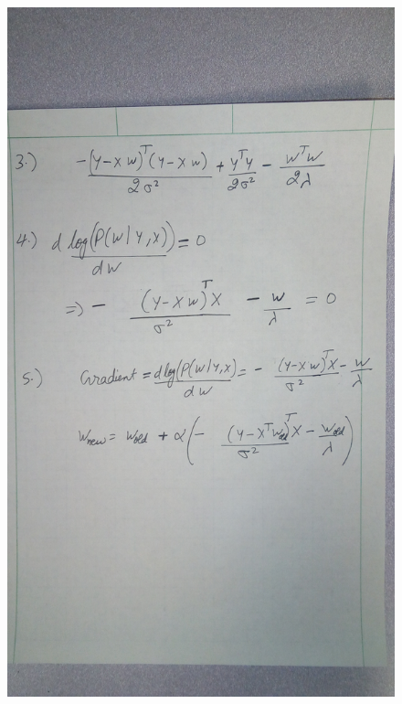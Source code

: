 \documentclass[fleqn]{article}
\begin{document}
\begin{adjustwidth}{4em}{0pt}
\begin{figure}[!ht]
		\end{figure}
		\begin{figure}
			\centering
			\includegraphics[width=1.4\textwidth, angle=270]{hw9_q1_2.jpg}
		\end{figure}
		\begin{figure}
			\centering

\end{figure}
\end{adjustwidth}
\end{document}
